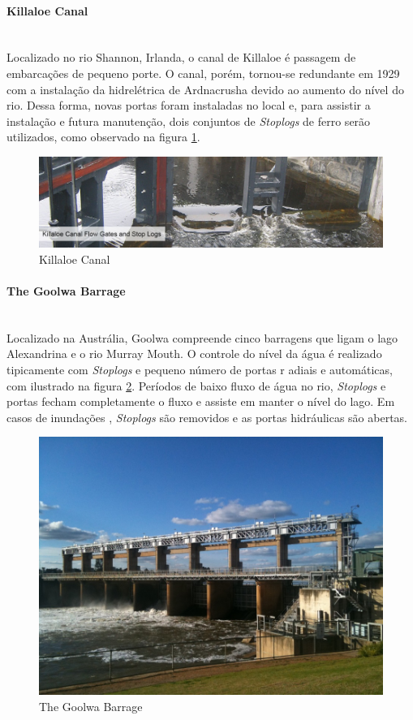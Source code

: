 \paragraph{Killaloe Canal}\mbox{}\\
Localizado no rio Shannon, Irlanda, o canal de Killaloe é passagem de embarcações de pequeno porte. O canal, porém, 
tornou-se redundante em 1929 com a instalação da hidrelétrica de Ardnacrusha devido ao aumento do nível do rio. Dessa forma, 
novas portas foram instaladas no local e, para assistir a instalação e futura
manutenção, dois conjuntos de \emph{Stoplogs} de ferro serão utilizados, como
observado na figura \ref{pesqbib_4}.

\begin{figure}[H]
    \centering
    \includegraphics[width=1\columnwidth]{figs/pesqbib/4.jpg}
    \caption{Killaloe Canal}
    \label{pesqbib_4}
\end{figure}   

\paragraph{The Goolwa Barrage}\mbox{}\\
Localizado na Austrália, Goolwa compreende cinco barragens que ligam o 
lago Alexandrina e o rio Murray Mouth. O controle do nível da água é 
realizado tipicamente com \emph{Stoplogs} e pequeno número de portas r
adiais e automáticas, com ilustrado na figura \ref{pesqbib_5}. 
Períodos de baixo fluxo de água no rio, \emph{Stoplogs} e portas fecham 
completamente o fluxo e assiste em manter o nível do lago. Em casos de inundações , \emph{Stoplogs} são removidos e as portas hidráulicas são abertas.
 

\begin{figure}[H]
    \centering
    \includegraphics[width=0.8\columnwidth]{figs/pesqbib/6.jpg}
    \caption{The Goolwa Barrage}
    \label{pesqbib_5}
\end{figure}   
 
